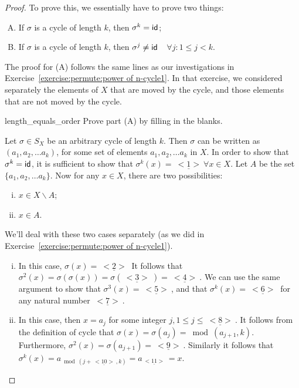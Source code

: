 \begin{proof}
To prove this, we essentially have to prove two things:
\begin{enumerate}[(A)]
\item
If $\sigma$ is a cycle of length $k$, then $\sigma^k = {\sf{i}d} $;
\item
If $\sigma$ is a cycle of length $k$, then $\sigma^j \neq {\sf{i}d} $~~$\forall j: 1 \le j < k.$
\end{enumerate}

\noindent
The proof for (A) follows the same lines as our investigations in Exercise~\ref{exercise:permute:power of n-cycle1}. In that exercise, we considered separately the elements of $X$ that are moved by the cycle, and those elements that are not moved by the cycle. 

\begin{exercise}{length_equals_order} Prove part (A) by filling in the blanks.

\noindent
Let $\sigma \in S_X$ be an arbitrary cycle of length $k$.  Then $\sigma$ can be written as $ (a_1, a_2, \ldots a_k)$, for some set of elements $a_1, a_2, \ldots a_k$ in $X$.  In order to show that $\sigma^k = {\sf{i}d} $, it is sufficient to show that 
$\sigma^k(x) = \underline{~<1>~}  \forall x \in X$. 
Let $A$ be the set  $\{a_1, a_2, \ldots a_k\}$.  Now for any $x \in X$, there are two possibilities:  
\begin{enumerate}[(i)]
\item
$x \in  X \backslash A$;
\item
$x \in A$. 
\end{enumerate}

\noindent
We'll deal with these two cases separately (as we did  in Exercise~\ref{exercise:permute:power of n-cycle1}).

\begin{enumerate}[(i)]
\item
In this case, $\sigma(x) = \underline{~<2>~} $  It follows that $\sigma^2(x) = \sigma( \sigma(x)) = \sigma( \underline{~<3>~}) = \underline{~<4>~}$. We can use the same argument to show that $\sigma^3(x) = \underline{~<5>~}$, and that $\sigma^k(x) = \underline{~<6>~}$ for any natural number $\underline{~<7>~}$.
\item
In this case, then $x = a_j$ for some integer $j, 1 \le j \le \underline{~<8>~}$.  It follows from the definition of cycle that $\sigma(x) = \sigma(a_j) = \bmod(a_{j+1},k)$. Furthermore, $\sigma^2(x) = \sigma(a_{j+1}) = \underline{~<9>~}$. Similarly it follows that $\sigma^{k}(x) = a_{\bmod(j+ \underline{~<10>~},k)} = a_{\underline{~<11>~}} = x$.
\end{enumerate}


\end{exercise}
\end{proof}
